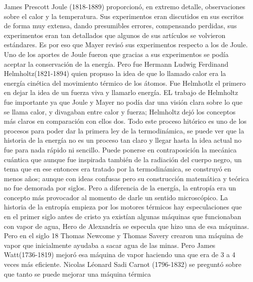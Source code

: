 James Prescott Joule (1818-1889) proporcionó, en extremo detalle, observaciones sobre el calor y la temperatura. Sus experimentos eran discutidos en sus escritos de forma muy extensa, dando presumibles errores, compensando perdidas, sus experimentos eran tan detallados que algunos de sus artículos se volvieron estándares. Es por eso que Mayer revisó sus experimentos respecto a los de Joule. Uno de los aportes de Joule fueron que gracias a sus experimentos se podía aceptar la conservación de la energía. Pero fue Hermann Ludwig Ferdinand Helmholtz(1821-1894) quien propuso la idea de que lo llamado calor era la energía cinética del movimiento térmico de los átomos. Fue Helmhotlz el primero en dejar la idea de un fuerza viva y llamarlo energía. EL trabajo de Helmholtz fue importante ya que Joule y  Mayer no podía dar una visión clara sobre lo que se llama calor, y divagaban entre calor y fuerza; Helmholtz dejó los conceptos más claros en comparación con ellos dos.  Todo este proceso hitórico es uno de los procesos para poder dar la primera ley de la termodinámica, se puede ver que la historia de la energía no es un proceso tan claro y llegar hasta la idea actual no fue para nada rápido ni sencillo. Puede ponerse en contraposición la mecánica cuántica que aunque fue inspirada también de la radiación del cuerpo negro, un tema que en ese entonces era tratado por la termodinámica, se construyó en menos años; aunque con ideas confusas pero su construcción matemática y teórica no fue demorada por siglos. Pero a diferencia de la energía, la entropía era un concepto más provocador al momento de darle un sentido microscópico. La historia de la  entropía empieza por los motores térmicos hay especulaciones que en el primer siglo antes de cristo ya existían algunas máquinas que funcionaban con vapor de agua, Hero de Alexandría se especula que hizo una de esa máquinas. Pero en el siglo 18 Thomas Newcome y Thomas Savery crearon una máquina de vapor que inicialmente ayudaba a sacar agua de las minas. Pero James Watt(1736-1819) mejoró esa máquina de vapor haciendo una que era de 3 a 4 veces más eficiente. Nicolas Léonard Sadi Carnot (1796-1832) se preguntó sobre que tanto se puede mejorar una máquina térmica 




































